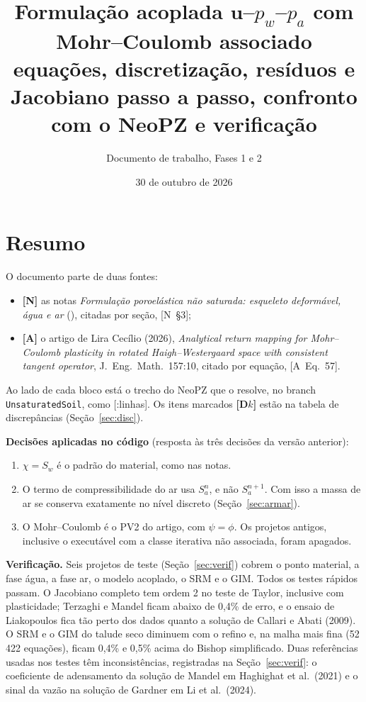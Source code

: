 \documentclass[11pt,a4paper]{article}
\title{Formulação acoplada $\mathbf u$--$p_w$--$p_a$ com Mohr--Coulomb associado\\[3pt]
\large equações, discretização, resíduos e Jacobiano passo a passo, confronto com o NeoPZ e verificação}
\author{Documento de trabalho, Fases 1 e 2}
\date{30 de outubro de 2026}
\numberwithin{equation}{section}
\newcommand{\code}[1]{\texttt{#1}}
\newcommand{\nota}[1]{{\footnotesize\textsf{[N~#1]}}}
\newcommand{\art}[1]{{\footnotesize\textsf{[A~#1]}}}
\newcommand{\loc}[2]{{\footnotesize[\path{#1}:#2]}}
\newcommand{\disc}[1]{\textcolor{red!70!black}{\textbf{\footnotesize[#1]}}}
\begin{document}
\maketitle
\vspace{-1.5em}

\section*{Resumo}

O documento parte de duas fontes:
\begin{itemize}
\item \textbf{[N]} as notas \emph{Formulação poroelástica não saturada: esqueleto deformável, água e ar}
(), citadas por seção, \nota{§3};
\item \textbf{[A]} o artigo de Lira Cecílio (2026), \emph{Analytical return mapping for Mohr--Coulomb plasticity in
rotated Haigh--Westergaard space with consistent tangent operator}, J.\ Eng.\ Math.\ 157:10, citado por equação,
\art{Eq.~57}.
\end{itemize}
Ao lado de cada bloco está o trecho do NeoPZ que o resolve, no branch \code{UnsaturatedSoil}, como
\loc{arquivo}{linhas}. Os itens marcados \disc{D$k$} estão na tabela de discrepâncias (Seção~\ref{sec:disc}).

\textbf{Decisões aplicadas no código} (resposta às três decisões da versão anterior):
\begin{enumerate}
\item $\chi=S_w$ é o padrão do material, como nas notas.
\item O termo de compressibilidade do ar usa $S_a^{n}$, e não $S_a^{n+1}$. Com isso a massa de ar se conserva
exatamente no nível discreto (Seção~\ref{sec:armar}).
\item O Mohr--Coulomb é o PV2 do artigo, com $\psi=\phi$. Os projetos antigos, inclusive o executável com a classe
iterativa não associada, foram apagados.
\end{enumerate}

\textbf{Verificação.} Seis projetos de teste (Seção~\ref{sec:verif}) cobrem o ponto material, a fase água, a fase ar, o
modelo acoplado, o SRM e o GIM. Todos os testes rápidos passam. O Jacobiano completo tem ordem 2 no teste de Taylor,
inclusive com plasticidade; Terzaghi e Mandel ficam abaixo de 0,4\% de erro, e o ensaio de Liakopoulos fica tão perto
dos dados quanto a solução de Callari e Abati (2009). O SRM e o GIM do talude seco diminuem com o refino e, na malha
mais fina (52\,422 equações), ficam 0,4\% e 0,5\% acima do Bishop simplificado. Duas referências usadas nos testes têm
inconsistências, registradas na Seção~\ref{sec:verif}: o coeficiente de adensamento da solução de Mandel em Haghighat et
al.\ (2021) e o sinal da vazão na solução de Gardner em Li et al.\ (2024).
\end{document}
